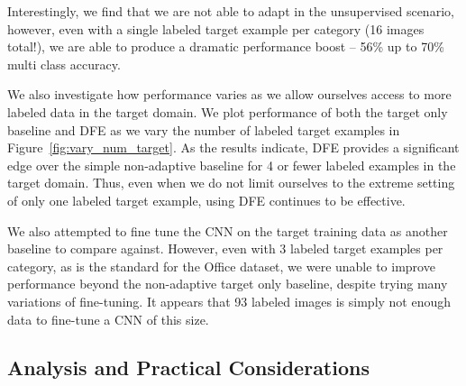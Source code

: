 Interestingly, we find that we are not able to adapt in the unsupervised scenario, however, even with a single labeled target example per category (16 images total!), we are able to produce a dramatic performance boost -- 56\% up to 70\% multi class accuracy.

We also investigate how performance varies as we allow ourselves access to more labeled data in the target domain. We plot performance of both the target only baseline and DFE as we vary the number of labeled target examples in Figure~\ref{fig:vary_num_target}.
As the results indicate, DFE provides a significant edge over the simple non-adaptive baseline for 4 or fewer labeled examples in the target domain. Thus, even when we do not limit ourselves to the extreme setting of only one labeled target example, using DFE continues to be effective.


 



We also attempted to fine tune the CNN on the target training data as another
baseline to compare against. However, even with 3 labeled target examples per
category, as is the standard for the Office dataset, we were unable to improve
performance beyond the non-adaptive target only baseline, despite trying many
variations of fine-tuning. It appears that 93 labeled images is simply not
enough data to fine-tune a CNN of this size.

\subsection{Analysis and Practical Considerations}
\label{sec:analysis}




